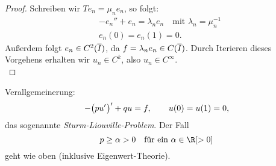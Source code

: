 \begin{proof}
    Schreiben wir $Te_n = \mu_n e_n$, so folgt:
    \begin{align*}
        & -e_n'' + e_n = \lambda_n e_n \quad \text{mit $\lambda_n = \mu_n^{-1}$}
        \\
        & e_n(0) = e_n(1) = 0
    . \end{align*}
    Außerdem folgt $e_n\in C^2(\overline{I})$, da $f = \lambda_n e_n \in
    C(\overline{I})$. Durch Iterieren dieses Vorgehens erhalten wir
    $u_n\in C^k$, also $u_n\in C^\infty$.
    \\
\end{proof}

Verallgemeinerung:
\[ -\bigl(p u'\mkern1mu\bigr)' + qu = f, \qquad u(0)=u(1)=0  , \]
das sogenannte \emph{Sturm-Liouville-Problem}. Der Fall
\[ p \geq \alpha > 0 \quad\text{für ein $\alpha\in\R[>0]$}  \]
geht wie oben (inklusive Eigenwert-Theorie).

